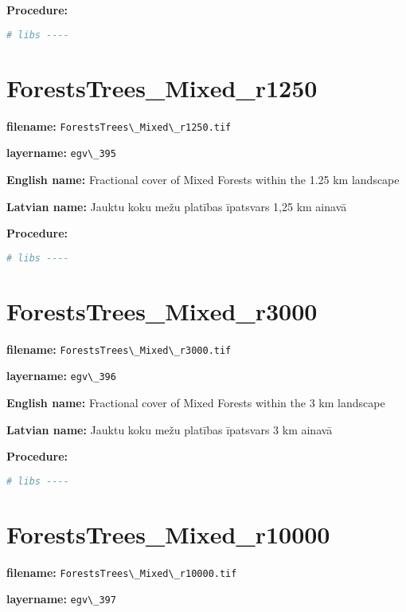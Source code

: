 \documentclass[
]{book}
\newcommand{\passthrough}[1]{#1}
\begin{document}
\textbf{Procedure:}

\begin{lstlisting}[language=R]
# libs ----
\end{lstlisting}

\section{ForestsTrees\_Mixed\_r1250}\label{ch06.395}

\textbf{filename:} \passthrough{\lstinline!ForestsTrees\_Mixed\_r1250.tif!}

\textbf{layername:} \passthrough{\lstinline!egv\_395!}

\textbf{English name:} Fractional cover of Mixed Forests within the 1.25 km landscape

\textbf{Latvian name:} Jauktu koku mežu platības īpatsvars 1,25 km ainavā

\textbf{Procedure:}

\begin{lstlisting}[language=R]
# libs ----
\end{lstlisting}

\section{ForestsTrees\_Mixed\_r3000}\label{ch06.396}

\textbf{filename:} \passthrough{\lstinline!ForestsTrees\_Mixed\_r3000.tif!}

\textbf{layername:} \passthrough{\lstinline!egv\_396!}

\textbf{English name:} Fractional cover of Mixed Forests within the 3 km landscape

\textbf{Latvian name:} Jauktu koku mežu platības īpatsvars 3 km ainavā

\textbf{Procedure:}

\begin{lstlisting}[language=R]
# libs ----
\end{lstlisting}

\section{ForestsTrees\_Mixed\_r10000}\label{ch06.397}

\textbf{filename:} \passthrough{\lstinline!ForestsTrees\_Mixed\_r10000.tif!}

\textbf{layername:} \passthrough{\lstinline!egv\_397!}
\end{document}
